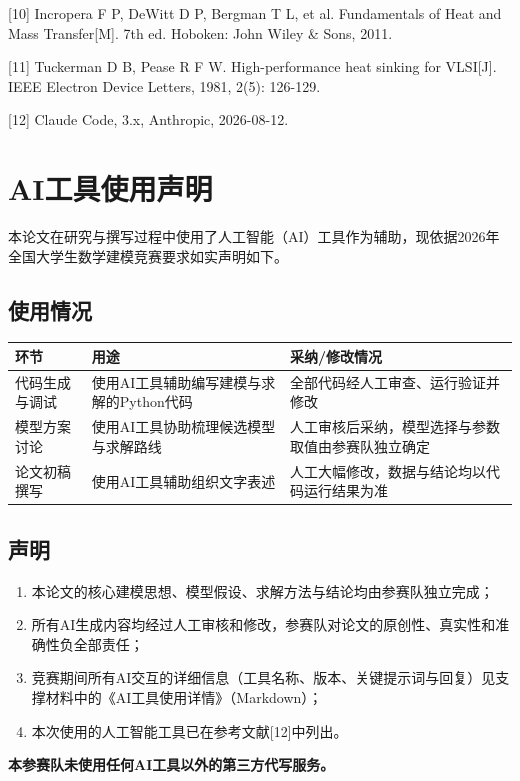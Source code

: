 \documentclass[withoutpreface]{cumcmthesis}
\begin{document}
[10] Incropera F P, DeWitt D P, Bergman T L, et al. Fundamentals of Heat and Mass Transfer[M]. 7th ed. Hoboken: John Wiley \& Sons, 2011.

[11] Tuckerman D B, Pease R F W. High-performance heat sinking for VLSI[J]. IEEE Electron Device Letters, 1981, 2(5): 126-129.

[12] Claude Code, 3.x, Anthropic, 2026-08-12.

\section{AI工具使用声明}
本论文在研究与撰写过程中使用了人工智能（AI）工具作为辅助，现依据2026年全国大学生数学建模竞赛要求如实声明如下。

\subsection{使用情况}
\begin{table}[htbp]
\centering
\small
\begin{tabularx}{\textwidth}{XXX}
\toprule
环节 & 用途 & 采纳/修改情况 \\
\midrule
代码生成与调试 & 使用AI工具辅助编写建模与求解的Python代码 & 全部代码经人工审查、运行验证并修改 \\
模型方案讨论 & 使用AI工具协助梳理候选模型与求解路线 & 人工审核后采纳，模型选择与参数取值由参赛队独立确定 \\
论文初稿撰写 & 使用AI工具辅助组织文字表述 & 人工大幅修改，数据与结论均以代码运行结果为准 \\
\bottomrule
\end{tabularx}
\end{table}
\subsection{声明}
\begin{enumerate}
  \item 本论文的核心建模思想、模型假设、求解方法与结论均由参赛队独立完成；
  \item 所有AI生成内容均经过人工审核和修改，参赛队对论文的原创性、真实性和准确性负全部责任；
  \item 竞赛期间所有AI交互的详细信息（工具名称、版本、关键提示词与回复）见支撑材料中的《AI工具使用详情》（Markdown）；
  \item 本次使用的人工智能工具已在参考文献[12]中列出。
\end{enumerate}
\textbf{本参赛队未使用任何AI工具以外的第三方代写服务。}
\end{document}
